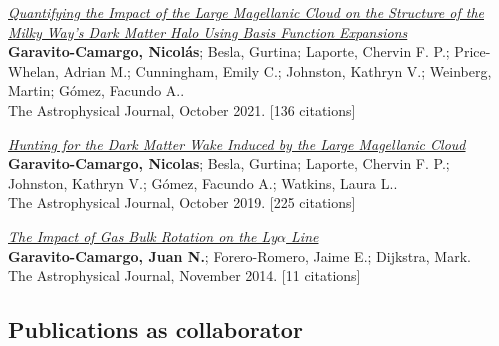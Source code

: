 \documentclass[14pt]{article}
\begin{document}
\begin{etaremune}
\item \textit{\href{https://ui.adsabs.harvard.edu/abs/2021ApJ...919..109G/abstract}{Quantifying the Impact of the Large Magellanic Cloud on the Structure of the Milky Way's Dark Matter Halo Using Basis Function Expansions}}\\
  {\small \color{darkgray} \textbf{Garavito-Camargo, Nicolás}; Besla, Gurtina; Laporte, Chervin F. P.; Price-Whelan, Adrian M.; Cunningham, Emily C.; Johnston, Kathryn V.; Weinberg, Martin; Gómez, Facundo A..\\
  The Astrophysical Journal, October 2021. [136 citations]}

\item \textit{\href{https://ui.adsabs.harvard.edu/abs/2019ApJ...884...51G/abstract}{Hunting for the Dark Matter Wake Induced by the Large Magellanic Cloud}}\\
  {\small \color{darkgray} \textbf{Garavito-Camargo, Nicolas}; Besla, Gurtina; Laporte, Chervin F. P.; Johnston, Kathryn V.; Gómez, Facundo A.; Watkins, Laura L..\\
  The Astrophysical Journal, October 2019. [225 citations]}

\item \textit{\href{https://ui.adsabs.harvard.edu/abs/2014ApJ...795..120G/abstract}{The Impact of Gas Bulk Rotation on the Ly$\alpha$ Line}}\\
  {\small \color{darkgray} \textbf{Garavito-Camargo, Juan N.}; Forero-Romero, Jaime E.; Dijkstra, Mark.\\
  The Astrophysical Journal, November 2014. [11 citations]}

\end{etaremune}

\subsection*{Publications as collaborator}
\end{document}
